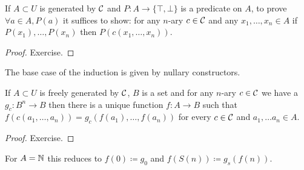 \begin{boxthe}
\begin{thm}
    If $A \subset U$ is generated by $\mathcal{C}$ and $P \colon A \to \{ \top, \bot\}$ is a predicate on $A$, to prove $\forall a \in A, P(a)$ it suffices to show: for any $n$-ary $c \in \mathcal{C}$ and any $x_1, \dots, x_n \in A$ if $P(x_1), \dots, P(x_n)$ then $P(c(x_1, \dots, x_n))$.
\end{thm}
\end{boxthe}
\begin{proof}
    Exercise.
\end{proof}

\begin{rem}
    The base case of the induction is given by nullary constructors.
\end{rem}

\begin{boxthe}
\begin{thm}
    If $A \subset U$ is freely generated by $\mathcal{C}$, $B$ is a set and for any $n$-ary $c \in \mathcal{C}$ we have a $g_c \colon B^n \to B$ then there is a unique function $f \colon A \to B$ such that $f(c(a_1, \dots, a_n)) = g_c(f(a_1), \dots, f(a_n))$ for every $c \in \mathcal{C}$ and $a_1, \dots a_n \in A$. 
\end{thm}
\begin{proof}
Exercise.
\end{proof}
\end{boxthe}

\begin{example}
    For $A = \mathbb{N}$ this reduces to $f(0) \coloneq g_0$ and $f(S(n)) \coloneq g_s(f(n))$.
\end{example}